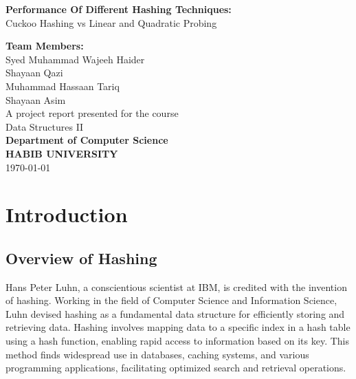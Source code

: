 \documentclass[12pt]{article}
\begin{document}
\begin{titlepage}
    \centering
    \vspace*{1cm}
    \Large{\textbf{Performance Of Different Hashing Techniques:}}\\
    \large{Cuckoo Hashing vs Linear and Quadratic Probing}\\
    \vspace{2cm}
    
    \vspace{2cm}
    \textbf{Team Members:}\\
    Syed Muhammad Wajeeh Haider\\
    Shayaan Qazi\\
    Muhammad Hassaan Tariq\\
    Shayaan Asim\\
    \vfill
    A project report presented for the course\\
    Data Structures II\\
    \vspace{1.5cm}
    \textbf{Department of Computer Science}\\
    \textbf{HABIB UNIVERSITY}\\  %
    \vspace{1cm}
    \today
\end{titlepage}

\tableofcontents
\newpage


\section{Introduction}

\subsection{Overview of Hashing}

Hans Peter Luhn, a conscientious scientist at IBM, is credited with the invention of hashing. Working in the field of Computer Science and Information Science, Luhn devised hashing as a fundamental data structure for efficiently storing and retrieving data. Hashing involves mapping data to a specific index in a hash table using a hash function, enabling rapid access to information based on its key. This method finds widespread use in databases, caching systems, and various programming applications, facilitating optimized search and retrieval operations.
\end{document}
